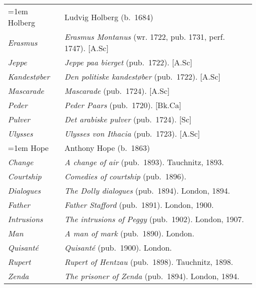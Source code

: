 \begin{xltabular}{\textwidth}{ lQ }
\hangindent=1em  Holberg & Ludvig Holberg (b.~1684) \\
\hspace{1em}\textit{Erasmus} & \textit{Erasmus Montanus} (wr. 1722, pub.  1731, perf. 1747). [A.Sc] \\ %
\hspace{1em}\textit{Jeppe} & \textit{Jeppe paa bierget} (pub.~1722). [A.Sc] \\
\hspace{1em}\textit{Kande\-støber} & \textit{Den politiske kandestøber} (pub.~1722). [A.Sc] \\
\hspace{1em}\textit{Mascarade} & \textit{Mascarade} (pub.~1724). [A.Sc] \\
\hspace{1em}\textit{Peder} & \textit{Peder Paars} (pub.~1720). [Bk.Ca] \\
\hspace{1em}\textit{Pulver} & \textit{Det arabiske pulver} (pub.~1724). [Sc] \\
\hspace{1em}\textit{Ulysses} & \textit{Ulysses von Ithacia} (pub.~1723). [A.Sc] \\

\hangindent=1em  Hope & Anthony Hope (b.~1863) \\
\hspace{1em}\textit{Change} & \textit{A change of air} (pub.~1893). Tauchnitz, 1893. \\
\hspace{1em}\textit{Courtship} & \textit{Comedies of courtship} (pub.~1896). \\
\hspace{1em}\textit{Dialogues} & \textit{The Dolly dialogues} (pub.~1894). London, 1894. \\ %
\hspace{1em}\textit{Father} & \textit{Father Stafford} (pub.~1891). London, 1900. \\
\hspace{1em}\textit{Intrusions} & \textit{The intrusions of Peggy} (pub.~1902). London, 1907. \\
\hspace{1em}\textit{Man} & \textit{A man of mark} (pub.~1890). London. \\
\hspace{1em}\textit{Quisanté} & \textit{Quisanté} (pub.~1900). London. \\
\hspace{1em}\textit{Rupert} & \textit{Rupert of Hentzau} (pub.~1898). Tauchnitz, 1898. \\
\hspace{1em}\textit{Zenda} & \textit{The prisoner of Zenda} (pub.~1894). London, 1894. \\


\end{xltabular}
